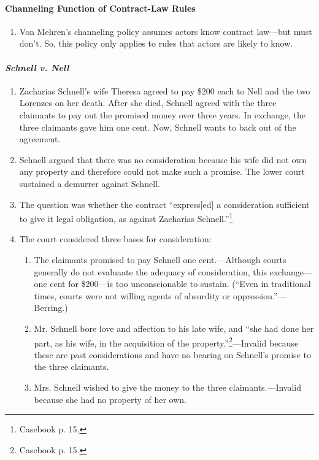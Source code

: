 \paragraph{Channeling Function of Contract-Law Rules}

\begin{enumerate}
    \item Von Mehren's channeling policy assumes actors know contract 
    law---but must don't. So, this policy only applies to rules that actors 
    are likely to know. 
\end{enumerate}

\paragraph{\emph{Schnell v. Nell}}

\begin{enumerate}
    \item Zacharias Schnell's wife Theresa agreed to pay \$200 each to Nell and 
    the two Lorenzes on her death. After she died, Schnell agreed with the 
    three claimants to pay out the promised money over three years. In 
    exchange, the three claimants gave him one cent. Now, Schnell wants to 
    back out of the agreement.
    \item Schnell argued that there was no consideration because his wife did 
    not own any property and therefore could not make such a promise. The 
    lower court sustained a demurrer against Schnell.
    \item The question was whether the contract ``express[ed] a consideration 
    sufficient to give it legal obligation, as against Zacharias 
    Schnell.''\footnote{Casebook p. 15.}
    \item The court considered three bases for consideration:
    \begin{enumerate}
        \item The claimants promised to pay Schnell one cent.---Although 
        courts generally do not evaluaate the adequacy of consideration, this 
        exchange---one cent for \$200---is too unconscionable to 
        sustain. (``Even in traditional times, courts were not willing agents 
        of absurdity or oppression.''---Berring.)
        \item Mr. Schnell bore love and affection to his late wife, and ``she 
        had done her part, as his wife, in the acquisition of the 
        property.''\footnote{Casebook p. 15.}---Invalid because these are past 
        considerations and have no bearing on Schnell's promise to the three 
        claimants.
        \item Mrs. Schnell wished to give the money to the three 
        claimants.---Invalid because she had no property of her own.
    \end{enumerate}
\end{enumerate}

